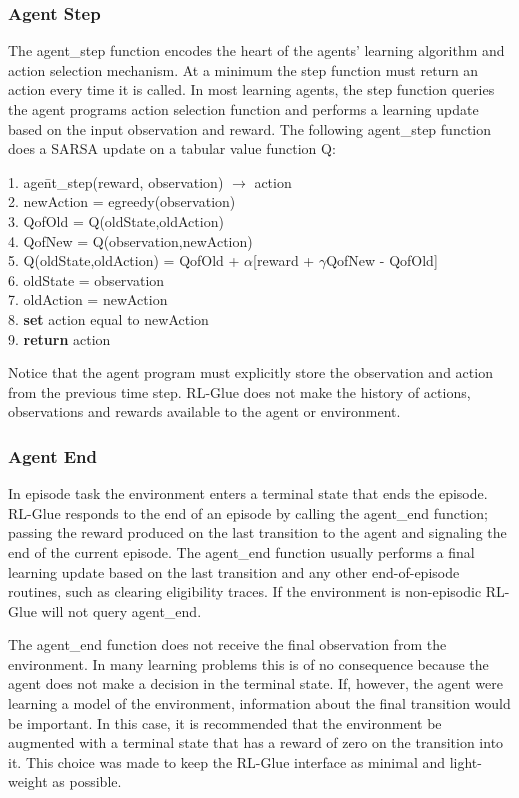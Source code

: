 \documentclass[11pt]{article}
\begin{document}
\subsubsection{Agent Step}
The agent\_step function encodes the heart of the agents' learning algorithm and action selection mechanism. At a minimum the step function must return an action every time it is called. In most learning agents, the step function queries the agent programs action selection function and performs a learning update based on the input observation and reward. The following agent\_step function does a SARSA update on a tabular value function Q:
\begin{tabbing}
1. age\=nt\_step(reward, observation) $\rightarrow$ action\\
2. \>newAction = egreedy(observation)\\
3. \> QofOld = Q(oldState,oldAction)\\
4. \> QofNew = Q(observation,newAction) \\
5. \> Q(oldState,oldAction) = QofOld + $\alpha$[reward + $\gamma$QofNew - QofOld]\\
6. \> oldState = observation\\
7.\> oldAction = newAction\\
8. \> {\bf set} action equal to newAction\\
9. {\bf return} action
\end{tabbing}  
Notice that the agent program must explicitly store the observation and action from the previous time step. RL-Glue does not make the history of actions, observations and rewards available to the agent or environment.

\subsubsection{Agent End}
In episode task the environment enters a terminal state that ends the episode. RL-Glue responds to the end of an episode by calling the agent\_end function; passing the reward produced on the last transition to the agent and signaling the end of the current episode. The agent\_end function usually performs a final learning update based on the last transition and any other end-of-episode routines, such as clearing eligibility traces. If the environment is non-episodic RL-Glue will not query agent\_end.

The agent\_end function does not receive the final observation from the environment. In many learning problems this is of no consequence because the agent does not make a decision in the terminal state. If, however, the agent were learning a model of the environment, information about the final transition would be important. In this case, it is recommended that the environment be augmented with a terminal state that has a reward of zero on the transition into it. This choice was made to keep the RL-Glue interface as minimal and light-weight as possible. 
\end{document}
